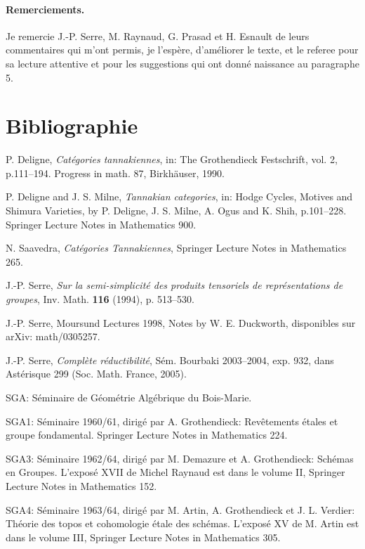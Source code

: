 \documentclass[10pt]{article}
\theoremstyle{deligne}
\begin{document}
\paragraph{Remerciements.}
Je remercie J.-P. Serre, M. Raynaud, G. Prasad et H. Esnault de leurs commentaires qui m'ont permis, je l'espère, d'améliorer le texte, et le referee pour sa lecture attentive et pour les suggestions qui ont donné naissance au paragraphe 5.

\section*{Bibliographie}
\begin{description}[labelwidth=2.2em,leftmargin=3.0em,style=sameline]
\item[{[1]}] P. Deligne, \emph{Catégories tannakiennes}, in: The Grothendieck Festschrift, vol. 2, p.111--194. Progress in math. 87, Birkhäuser, 1990.
\item[{[2]}] P. Deligne and J. S. Milne, \emph{Tannakian categories}, in: Hodge Cycles, Motives and Shimura Varieties, by P. Deligne, J. S. Milne, A. Ogus and K. Shih, p.101--228. Springer Lecture Notes in Mathematics 900.
\item[{[3]}] N. Saavedra, \emph{Catégories Tannakiennes}, Springer Lecture Notes in Mathematics 265.
\item[{[4]}] J.-P. Serre, \emph{Sur la semi-simplicité des produits tensoriels de représentations de groupes}, Inv. Math. \textbf{116} (1994), p. 513--530.
\item[{[5]}] J.-P. Serre, Moursund Lectures 1998, Notes by W. E. Duckworth, disponibles sur arXiv: math/0305257.
\item[{[6]}] J.-P. Serre, \emph{Complète réductibilité}, Sém. Bourbaki 2003--2004, exp. 932, dans Astérisque 299 (Soc. Math. France, 2005).
\end{description}

SGA: Séminaire de Géométrie Algébrique du Bois-Marie.

SGA1: Séminaire 1960/61, dirigé par A. Grothendieck: Revêtements étales et groupe fondamental. Springer Lecture Notes in Mathematics 224.

SGA3: Séminaire 1962/64, dirigé par M. Demazure et A. Grothendieck: Schémas en Groupes. L'exposé XVII de Michel Raynaud est dans le volume II, Springer Lecture Notes in Mathematics 152.

SGA4: Séminaire 1963/64, dirigé par M. Artin, A. Grothendieck et J. L. Verdier: Théorie des topos et cohomologie étale des schémas. L'exposé XV de M. Artin est dans le volume III, Springer Lecture Notes in Mathematics 305.
\end{document}

